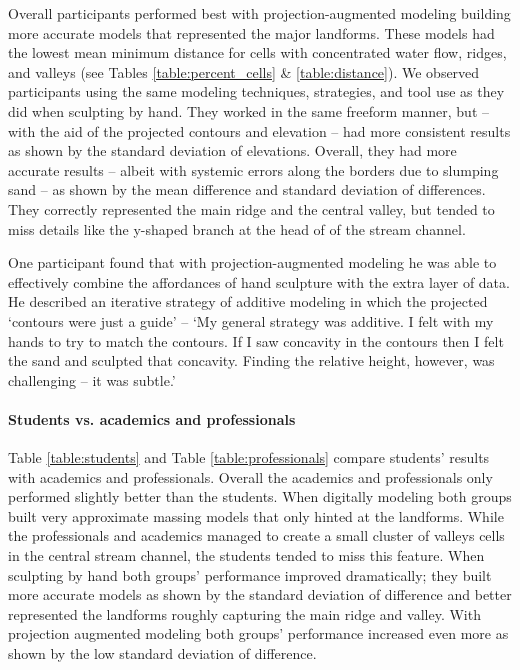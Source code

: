 Overall participants performed best
with projection-augmented modeling
building more accurate models 
that represented the major landforms.
%
These models had the lowest mean minimum distance 
for cells with concentrated water flow, ridges, and valleys
(see Tables \ref{table:percent_cells} \& \ref{table:distance}). 
%
We observed participants using the same
modeling techniques, strategies, and tool use
as they did when sculpting by hand. 
They worked in the same freeform manner, but 
-- with the aid of the projected contours and elevation --
had more consistent results 
as shown by the standard deviation of elevations.
%
Overall, they had more accurate results
-- albeit with systemic errors along the borders 
due to slumping sand --
as shown by the mean difference and
standard deviation of differences. 
%
They correctly represented the main ridge and 
the central valley, but tended to miss details
like the y-shaped branch at the head of
of the stream channel. 

One participant found that 
with projection-augmented modeling 
he was able to effectively combine 
the affordances of hand sculpture 
with the extra layer of data. 
%
He described an iterative strategy of additive modeling
in which the projected `contours were just a guide' --  
`My general strategy was additive. 
I felt with my hands to try to match the contours. 
If I saw concavity in the contours 
then I felt the sand and sculpted that concavity.
Finding the relative height, however, was challenging -- 
it was subtle.'

\paragraph{Students vs. academics and professionals}
%
Table \ref{table:students} and Table \ref{table:professionals}
compare students' results 
with academics and professionals. 
Overall the academics and professionals
only performed slightly better than the students.
When digitally modeling both groups 
built very approximate massing models
that only hinted at the landforms. 
While the professionals and academics 
managed to create a small cluster of valleys cells
in the central stream channel, 
the students tended to miss this feature. 
When sculpting by hand
both groups' performance improved dramatically;
they built more accurate models
as shown by the standard deviation of difference
and better represented the landforms
roughly capturing the main ridge and valley. 
%
With projection augmented modeling
both groups' performance increased even more
as shown by the low standard deviation of difference.

